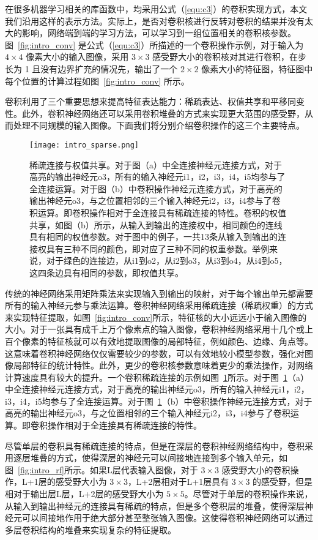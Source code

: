 在很多机器学习相关的库函数中，均采用公式（\ref{equ:c3}）的卷积实现方式，本文我们沿用这样的表示方法。实际上，是否对卷积核进行反转对卷积的结果并没有太大的影响，网络端到端的学习方法，可以学习到一组位置相关的卷积核参数。图~\ref{fig:intro_conv} 是公式（\ref{equ:c3}）所描述的一个卷积操作示例，对于输入为 $4\times4$ 像素大小的输入图像，采用 $3\times3$ 感受野大小的卷积核对其进行卷积，在步长为 1 且没有边界扩充的情况先，输出了一个 $2\times2$ 像素大小的特征图，特征图中每个位置的计算过程如图~\ref{fig:intro_conv} 所示。

卷积利用了三个重要思想来提高特征表达能力：稀疏表达、权值共享和平移同变性。此外，卷积神经网络还可以采用卷积堆叠的方式来实现更大范围的感受野，从而处理不同规模的输入图像。下面我们将分别介绍卷积操作的这三个主要特点。


\begin{figure}[h]
\centering
\texttt{[image: intro\_sparse.png]}
\caption{稀疏连接与权值共享。对于图（a）中全连接神经元连接方式，对于高亮的输出神经元o3，所有的输入神经元i1，i2，i3，i4，i5均参与了全连接运算。对于图（b）中卷积操作神经元连接方式，对于高亮的输出神经元o3，与之位置相邻的三个输入神经元i2，i3，i4参与了卷积运算。即卷积操作相对于全连接具有稀疏连接的特性。卷积的权值共享，如图（b）所示，从输入到输出的连接权中，相同颜色的连线具有相同的权值参数。对于图中的例子，一共13条从输入到输出的连接权具有三种不同的颜色，即对应了三种不同的权重参数。举例来说，对于绿色的连接边，从i1到o2，从i2到o3，从i3到o4，从i4到o5，这四条边具有相同的参数，即权值共享。}
\label{fig:intro_sparse}
\end{figure}


传统的神经网络采用矩阵乘法来实现输入到输出的映射，对于每个输出单元都需要所有的输入神经元参与乘法运算。卷积神经网络采用稀疏连接（稀疏权重）的方式来实现特征提取，如图~\ref{fig:intro_conv}所示，特征核的大小远远小于输入图像的大小。对于一张具有成千上万个像素点的输入图像，卷积神经网络采用十几个或上百个像素的特征核就可以有效地提取图像的局部特征，例如颜色、边缘、角点等。这意味着卷积神经网络仅仅需要较少的参数，可以有效地较小模型参数，强化对图像局部特征的统计特性。此外，更少的卷积核参数意味着更少的乘法操作，对网络计算速度具有较大的提升。一个卷积稀疏连接的示例如图~\ref{fig:intro_sparse}所示。对于图~\ref{fig:intro_sparse}（a）中全连接神经元连接方式，对于高亮的输出神经元o3，所有的输入神经元i1，i2，i3，i4，i5均参与了全连接运算。对于图~\ref{fig:intro_sparse}（b）中卷积操作神经元连接方式，对于高亮的输出神经元o3，与之位置相邻的三个输入神经元i2，i3，i4参与了卷积运算。即卷积操作相对于全连接具有稀疏连接的特性。

尽管单层的卷积具有稀疏连接的特点，但是在深层的卷积神经网络结构中，卷积采用逐层堆叠的方式，使得深层的神经元可以间接地连接到多个输入单元，如图~\ref{fig:intro_rf}所示。如果L层代表输入图像，对于 $3\times3$ 感受野大小的卷积操作，L+1层的感受野大小为 $3\times3$，L+2层相对于L+1层具有 $3\times3$ 的感受野，但是相对于输出层L层，L+2层的感受野大小为 $5\times5$。尽管对于单层的卷积操作来说，从输入到输出神经元的连接具有稀疏的特点，但是多个卷积层的堆叠，使得深层神经元可以间接地作用于绝大部分甚至整张输入图像。这使得卷积神经网络可以通过多层卷积结构的堆叠来实现复杂的特征提取。

